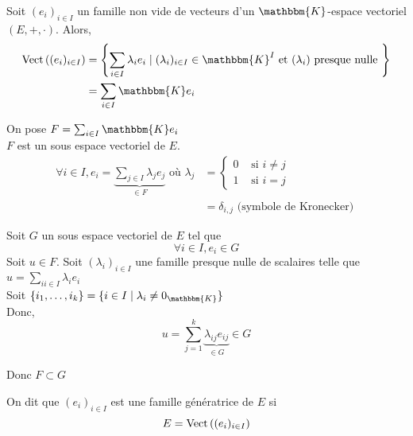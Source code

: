 \begin{prop}
	Soit $(e_i)_{i\in I}$ un famille non vide de vecteurs d'un $\mathbbm{K}$-espace vectoriel $(E,+,\cdot)$. Alors,
	\begin{align*}
		\Vect\left( (e_i)_{i \in I} \right)
		&= \left\{ \sum_{i \in I} \lambda_i e_i  \mid (\lambda_i)_{i \in I} \in \mathbbm{K}^I \text{ et } (\lambda_i) \text{ presque nulle } \right\} \\
		&= \sum_{i \in I} \mathbbm{K}e_i \\
	\end{align*}
\end{prop}

\begin{prv}
	On pose $F = \sum_{i \in I}\mathbbm{K}e_i$\\
	$F$ est un sous espace vectoriel de $E$.\\
	\begin{align*}
		\forall i \in I, e_i = \underbrace{\sum_{j \in I} \lambda_j e_j}_{\in F} \text{ où }
		\lambda_j &= \begin{cases}
			0 &\text{ si } i \neq j\\
			1 &\text{ si } i = j
		\end{cases}\\
		&= \delta_{i,j} \text{ (symbole de Kronecker) }
	\end{align*}

	Soit $G$ un sous espace vectoriel de $E$ tel que \[
		\forall i \in I, e_i \in G
	\] Soit $u \in F$.
	Soit $(\lambda_i)_{i\in I}$ une famille presque nulle de scalaires telle que $ u = \sum_{ii \in I} \lambda_i e_i$\\
	Soit $\{i_1,\ldots,i_k\} = \{i \in I  \mid  \lambda_i \neq 0_\mathbbm{K}\}  $\\
	Donc, \[
		u = \sum_{j = 1}^k \underbrace{\lambda_{ij}e_{ij}}_{\in G} \in G
	\] 

	Donc $F \subset G$
\end{prv}

\begin{defn}
	On dit que $(e_i)_{i\in I}$ est une famille génératrice de $E$ si \[
		E = \operatorname{Vect}\left( (e_i)_{i \in I} \right) 
	\]
\end{defn}

